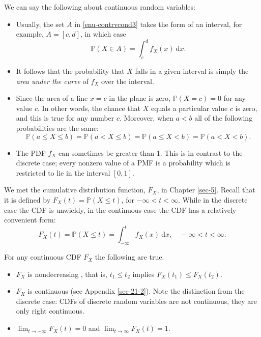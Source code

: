 \documentclass[captions=tableheading]{scrbook}
\begin{document}
\begin{rem}
We can say the following about continuous random variables:
\begin{itemize}
\item Usually, the set \(A\) in \ref{enu-contrvcond3} takes the form of an interval, for example, \(A=[c,d]\), in which case
  \begin{equation}
  \mathbb{P}(X\in A)=\int_{c}^{d}f_{X}(x)\:\mathrm{d} x.
  \end{equation}
\item It follows that the probability that \(X\) falls in a given interval is simply the \emph{area under the curve} of \(f_{X}\) over the interval.
\item Since the area of a line \(x=c\) in the plane is zero, \(\mathbb{P}(X=c)=0\)  for any value \(c\). In other words, the chance that \(X\) equals a particular value \(c\) is zero, and this is true for any number \(c\). Moreover, when \(a<b\) all of the following probabilities are the same:
  \begin{equation}
  \mathbb{P}(a\leq X\leq b)=\mathbb{P}(a<X\leq b)=\mathbb{P}(a\leq X<b)=\mathbb{P}(a<X<b).
  \end{equation}
\item The PDF \(f_{X}\) can sometimes be greater than 1. This is in contrast to the discrete case; every nonzero value of a PMF is a probability which is restricted to lie in the interval \([0,1]\).
\end{itemize}

\end{rem}

We met the cumulative distribution function, \(F_{X}\), in Chapter \ref{sec-5}. Recall that it is defined by \(F_{X}(t)=\mathbb{P}(X\leq t)\), for \(-\infty<t<\infty\). While in the discrete case the CDF is unwieldy, in the continuous case the CDF has a relatively convenient form:
\begin{equation}
F_{X}(t)=\mathbb{P}(X\leq t)=\int_{-\infty}^{t}f_{X}(x)\:\mathrm{d} x,\quad -\infty < t < \infty.
\end{equation}

\begin{rem}
For any continuous CDF \(F_{X}\) the following are true.
\begin{itemize}
\item \(F_{X}\) is nondecreasing , that is, \(t_{1}\leq t_{2}\) implies \(F_{X}(t_{1})\leq F_{X}(t_{2})\).
\item \(F_{X}\) is continuous (see Appendix \ref{sec-21-2}). Note the distinction from the discrete case: CDFs of discrete random variables are not continuous, they are only right continuous.
\item \(\lim_{t\to-\infty}F_{X}(t)=0\) and \(\lim_{t\to\infty}F_{X}(t)=1\).
\end{itemize}

\end{rem}
\end{document}
